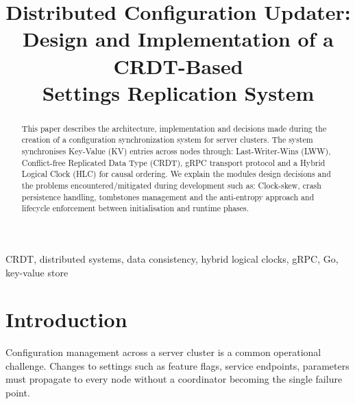 \documentclass[conference]{IEEEtran}
\begin{document}
\title{Distributed Configuration Updater:\\
  Design and Implementation of a CRDT-Based\\
Settings Replication System}

\author{
}

\maketitle

\begin{abstract}
  This paper describes the architecture, implementation and decisions made during
  the creation of a configuration synchronization system for server clusters.
  The system synchronises Key-Value (KV) entries across nodes through: Last-Writer-Wins (LWW),
  Conflict-free Replicated Data Type (CRDT), gRPC transport protocol and a Hybrid Logical Clock (HLC) for causal ordering.
  We explain the {\color{violet}modules design decisions} and the problems encountered/mitigated during development such as: Clock-skew,
  crash persistence handling, tombstones management and the anti-entropy approach and lifecycle enforcement between initialisation
  and runtime phases.
\end{abstract}

\begin{IEEEkeywords}
  CRDT, distributed systems, data consistency, hybrid logical clocks,
  gRPC, Go, key-value store
\end{IEEEkeywords}

\section{Introduction}

Configuration management across a server cluster is a common operational
challenge. Changes to settings such as feature flags, service endpoints,
parameters must propagate to every node without a coordinator becoming
the single failure point.
\end{document}
